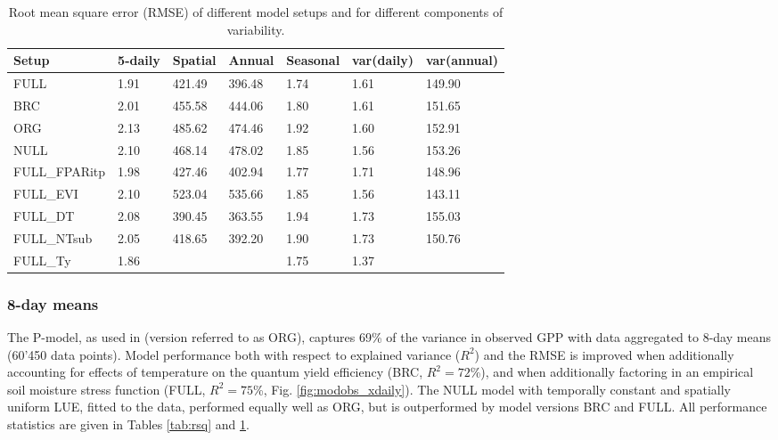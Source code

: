 \documentclass{myreport}
\begin{document}
\begin{table}
\centering
\begin{tabular}{lllllll}
  \toprule
  Setup & 5-daily & Spatial & Annual & Seasonal & var(daily) & var(annual) \\ 
  \midrule
  FULL & 1.91 & 421.49 & 396.48 & 1.74 & 1.61 & 149.90 \\ 
  BRC & 2.01 & 455.58 & 444.06 & 1.80 & 1.61 & 151.65 \\ 
  ORG & 2.13 & 485.62 & 474.46 & 1.92 & 1.60 & 152.91 \\ 
  NULL & 2.10 & 468.14 & 478.02 & 1.85 & 1.56 & 153.26 \\ 
  \midrule
  FULL\_FPARitp & 1.98 & 427.46 & 402.94 & 1.77 & 1.71 & 148.96 \\ 
  FULL\_EVI & 2.10 & 523.04 & 535.66 & 1.85 & 1.56 & 143.11 \\ 
  \midrule
  FULL\_DT & 2.08 & 390.45 & 363.55 & 1.94 & 1.73 & 155.03 \\ 
  FULL\_NTsub & 2.05 & 418.65 & 392.20 & 1.90 & 1.73 & 150.76 \\ 
  FULL\_Ty & 1.86 &  &  & 1.75 & 1.37 & \\ 
  \bottomrule
  \end{tabular}
\caption{Root mean square error (RMSE) of different model setups and for different components of variability.} 
\label{tab:rmse}
\end{table}

\subsubsection{8-day means}

The P-model, as used in \cite{wang17natpl} (version referred to as ORG), captures 69\% of the variance in observed GPP with data aggregated to 8-day means (60’450 data points). Model performance both with respect to explained variance ($R^2$) and the RMSE is improved when additionally accounting for effects of temperature on the quantum yield efficiency (BRC, $R^2 = 72$\%), and when additionally factoring in an empirical soil moisture stress function (FULL, $R^2 = 75$\%, Fig. \ref{fig:modobs_xdaily}). The NULL model with temporally constant and spatially uniform LUE, fitted to the data, performed equally well as ORG, but is outperformed by model versions BRC and FULL. All performance statistics are given in Tables \ref{tab:rsq} and \ref{tab:rmse}. %
\end{document}
